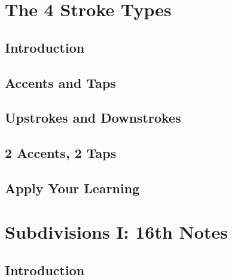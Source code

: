 \documentclass[12pt,letterpaper]{book}
\begin{document}
\section{The 4 Stroke Types}


\subsection{Introduction}

\subsection{Accents and Taps}

\subsection{Upstrokes and Downstrokes}

\subsection{2 Accents, 2 Taps}

\subsection{Apply Your Learning}

\section{Subdivisions I: 16th Notes}

\subsection{Introduction}
\end{document}
